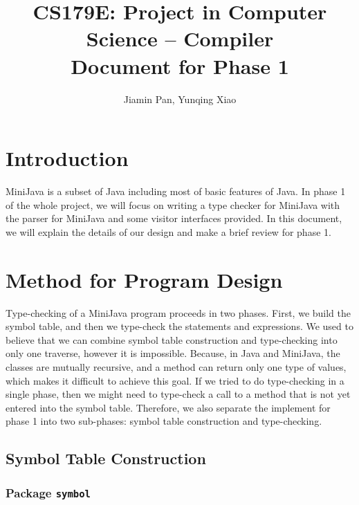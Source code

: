 \documentclass[letterpaper, 14pt]{article}
\begin{document}
\title{CS179E: Project in Computer Science -- Compiler\\ Document for Phase 1}
\author{Jiamin Pan, Yunqing Xiao}
\date{}
\maketitle

\section{Introduction}

MiniJava is a subset of Java including most of basic features of Java. \cite{homepage}
In phase 1 of the whole project, we will focus on writing a type checker for MiniJava 
with the parser for MiniJava and some visitor interfaces provided. In this document,
we will explain the details of our design and make a brief review for phase 1. 

\section{Method for Program Design}

Type-checking of a MiniJava program proceeds in two phases. First, we build the symbol table, and then we type-check the statements and expressions. \cite{book} We used to believe that we can combine symbol table construction and type-checking into only one traverse, however it is impossible. Because, in Java and MiniJava, the classes are mutually recursive, and a method can return only one type of values, which makes it difficult to achieve this goal. If we tried to do type-checking in a single phase, then we might need to type-check a call to a method that is not yet entered into the symbol table. Therefore, we also separate the implement for phase 1 into two sub-phases: symbol table construction and type-checking. 

\subsection{Symbol Table Construction}

\subsubsection{Package \texttt{symbol}}
\end{document}
